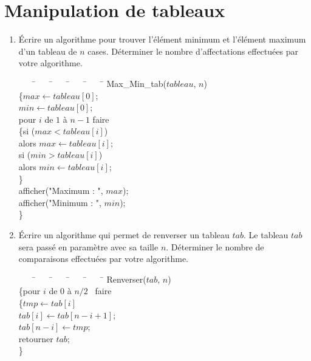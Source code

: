 \documentclass[10pt,a4paper]{article}
\begin{document}
\section{Manipulation de tableaux}
\begin{enumerate}
	\item Écrire un algorithme pour trouver l'élément minimum et l'élément maximum d'un tableau de $n$ cases. Déterminer le nombre d'affectations effectuées par votre algorithme.

	\begin{tcolorbox}
		\begin{tabbing}
			~~~~\=~~~~\=~~~~\=~~~~\=~~~~\=\kill
		Max\_Min\_tab($tableau$, $n$) \\
		\>\{$max \leftarrow tableau[0]$;\\
		\>$min \leftarrow tableau[0]$;\\
		\>pour $i$ de $1$ à $n-1$ faire \\
		\>\>\{si ($max < tableau[i]$)\\
		\>\>\>alors $max \leftarrow tableau[i]$;\\
		\>\> si ($min > tableau[i]$)\\
		\>\>\>alors $min \leftarrow tableau[i]$;\\
		\>\> \}\\
		\>afficher("Maximum : ", $max$);\\
		\>afficher("Minimum : ", $min$);\\
		\> \}\\
		\end{tabbing}
	\end{tcolorbox}
	
	
	\item Écrire un algorithme qui permet de renverser un tableau $tab$. Le tableau $tab$ sera passé en paramètre avec sa taille $n$. Déterminer le nombre de comparaisons effectuées par votre algorithme.
	
	
	\begin{tcolorbox}
		\begin{tabbing}
			~~~~\=~~~~\=~~~~\=~~~~\=~~~~\=\kill
		Renverser($tab$, $n$) \\
		\>\{pour $i$ de $0$ à $n/2$ \ faire \\
		\>\>\{$tmp \leftarrow tab[i]$\\
		\>\>$tab[i] \leftarrow tab[n-i+1]$;\\
		\>\>$tab[n - i] \leftarrow tmp$;\\
		\>retourner $tab$;\\
		\>\}\\
		\end{tabbing}
	\end{tcolorbox}	
	

\end{enumerate}
\end{document}
